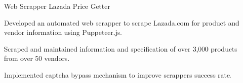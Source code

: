 \cventry
{Web Scrapper} %
{Lazada Price Getter} %
{\href{https://www.google.com}{\faGithubSquare}} %
{\diNodejsPlain \space \space  } %
{
	\begin{cvitems} %
		\item Developed an automated web scrapper to scrape Lazada.com for product and vendor
		information using Puppeteer.js.
		\item Scraped and maintained information and specification of over 3,000 products
		from over 50 vendors.
		\item Implemented captcha bypass mechanism to improve scrappers success rate.
	\end{cvitems}
}
